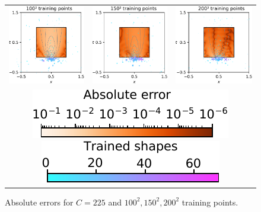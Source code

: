 \documentclass[12pt]{report} %
\begin{document}
\clearpage
\begin{figure}
\hspace*{-1cm}
\begin{tabular}{ccc}
  {\includegraphics[width=.35\textwidth, clip=true,trim={0 0 0 0}]{imagenes/experiments/2d/heat_1d/225_100.pdf}}  &
  {\includegraphics[width=.35\textwidth, clip=true,trim={0 0 0 0}]{imagenes/experiments/2d/heat_1d/225_150.pdf}} &
   {\includegraphics[width=.35\textwidth, clip=true,trim={0 0 0 0}]{imagenes/experiments/2d/heat_1d/225_200.pdf}}  \\
   \multicolumn{3}{c}{{\includegraphics[width=.3\textwidth]{imagenes/experiments/2d/heat_1d/model_curves_legend_2_2.pdf}}  {\includegraphics[width=.3\textwidth]{imagenes/experiments/2d/heat_1d/trained_shapes_cbar.pdf}}}
\end{tabular}
\caption{Absolute errors for $C=225$ and $100^2,150^2,200^2$ training points.}
\label{fig:heat-1d-experiment-model-absolute-errors-improvement}
\end{figure}
\end{document}
